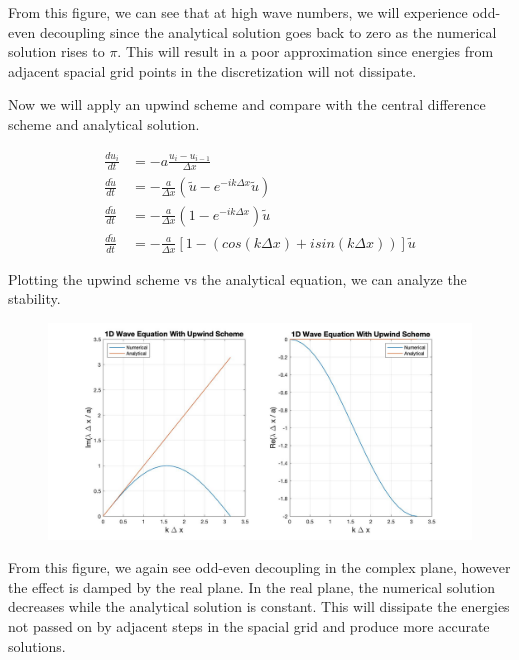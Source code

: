 \documentclass[10pt]{article}
\begin{document}
	From this figure, we can see that at high wave numbers, we will experience odd-even decoupling since the analytical solution goes back to zero as the numerical solution rises to $\pi$. This will result in a poor approximation since energies from adjacent spacial grid points in the discretization will not dissipate.
	
	Now we will apply an upwind scheme and compare with the central difference scheme and analytical solution.
	
	\begin{equation} \label{1D_wave_semi2}
		\begin{aligned}
			\frac{du_i}{dt} &= - a \frac{u_{i} - u_{i-1}}{\Delta x} \\
			\frac{d \tilde u}{dt} &= - \frac{a}{\Delta x} \left( \tilde{u} - e^{-ik \Delta x} \tilde{u} \right) \\
			\frac{d \tilde u}{dt} &= - \frac{a}{\Delta x} \left( 1- e^{-ik \Delta x} \right) \tilde{u} \\
			\frac{d \tilde u}{dt} &= - \frac{a}{\Delta x} \left[ 1 - (cos(k \Delta x) + i sin(k \Delta x)) \right] \tilde{u} 
		\end{aligned}
	\end{equation}
	
	Plotting the upwind scheme vs the analytical equation, we can analyze the stability.
	
	\begin{figure}[h]
		\includegraphics[width=16cm]{wave_upwind}
		\centering
	\end{figure}

	From this figure, we again see odd-even decoupling in the complex plane, however the effect is damped by the real plane. In the real plane, the numerical solution decreases while the analytical solution is constant. This will dissipate the energies not passed on by adjacent steps in the spacial grid and produce more accurate solutions.
	
\end{document}
